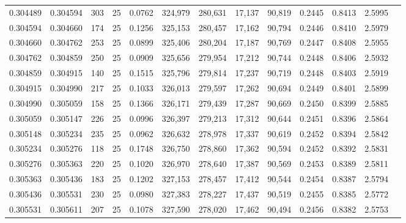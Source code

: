 \begin{tabular}{rrrrrrrrrrrrr}
0.304489 & 0.304594 &   303 &  25 &                                     0.0762 & 324,979 & 280,631 &  17,137 &  90,819 & 0.2445 & 0.8413 & 2.5995 \\
0.304594 & 0.304660 &   174 &  25 &                                     0.1256 & 325,153 & 280,457 &  17,162 &  90,794 & 0.2446 & 0.8410 & 2.5979 \\
0.304660 & 0.304762 &   253 &  25 &                                     0.0899 & 325,406 & 280,204 &  17,187 &  90,769 & 0.2447 & 0.8408 & 2.5955 \\
0.304762 & 0.304859 &   250 &  25 &                                     0.0909 & 325,656 & 279,954 &  17,212 &  90,744 & 0.2448 & 0.8406 & 2.5932 \\
0.304859 & 0.304915 &   140 &  25 &                                     0.1515 & 325,796 & 279,814 &  17,237 &  90,719 & 0.2448 & 0.8403 & 2.5919 \\
0.304915 & 0.304990 &   217 &  25 &                                     0.1033 & 326,013 & 279,597 &  17,262 &  90,694 & 0.2449 & 0.8401 & 2.5899 \\
0.304990 & 0.305059 &   158 &  25 &                                     0.1366 & 326,171 & 279,439 &  17,287 &  90,669 & 0.2450 & 0.8399 & 2.5885 \\
0.305059 & 0.305147 &   226 &  25 &                                     0.0996 & 326,397 & 279,213 &  17,312 &  90,644 & 0.2451 & 0.8396 & 2.5864 \\
0.305148 & 0.305234 &   235 &  25 &                                     0.0962 & 326,632 & 278,978 &  17,337 &  90,619 & 0.2452 & 0.8394 & 2.5842 \\
0.305234 & 0.305276 &   118 &  25 &                                     0.1748 & 326,750 & 278,860 &  17,362 &  90,594 & 0.2452 & 0.8392 & 2.5831 \\
0.305276 & 0.305363 &   220 &  25 &                                     0.1020 & 326,970 & 278,640 &  17,387 &  90,569 & 0.2453 & 0.8389 & 2.5811 \\
0.305363 & 0.305436 &   183 &  25 &                                     0.1202 & 327,153 & 278,457 &  17,412 &  90,544 & 0.2454 & 0.8387 & 2.5794 \\
0.305436 & 0.305531 &   230 &  25 &                                     0.0980 & 327,383 & 278,227 &  17,437 &  90,519 & 0.2455 & 0.8385 & 2.5772 \\
0.305531 & 0.305611 &   207 &  25 &                                     0.1078 & 327,590 & 278,020 &  17,462 &  90,494 & 0.2456 & 0.8382 & 2.5753 \\

\end{tabular}
